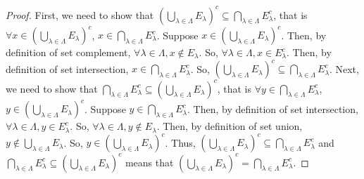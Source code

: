 \documentclass[12pt,letterpaper]{article}
\begin{document}
\begin{itemize}[leftmargin=!,labelindent=5pt]
\begin{itemize}
                    \begin{spacing}{1.175}
                        \begin{proof}
                            First, we need to show that $(\bigcup_{\lambda \in \Lambda} E_\lambda)^c \subseteq \bigcap_{\lambda \in \Lambda} E_{\lambda}^c$, that is $\forall x \in (\bigcup_{\lambda \in \Lambda} E_\lambda)^c$, $x \in \bigcap_{\lambda \in \Lambda} E_{\lambda}^c$.
                            Suppose $x \in (\bigcup_{\lambda \in \Lambda} E_\lambda)^c$.
                            Then, by definition of set complement, $\forall \lambda \in \Lambda, x \notin E_\lambda$.
                            So, $\forall \lambda \in \Lambda, x \in E_\lambda^c$.
                            Then, by definition of set intersection, $x \in \bigcap_{\lambda \in \Lambda} E_{\lambda}^c$.
                            So, $(\bigcup_{\lambda \in \Lambda} E_\lambda)^c \subseteq \bigcap_{\lambda \in \Lambda} E_{\lambda}^c$.
                            Next, we need to show that $\bigcap_{\lambda \in \Lambda} E_{\lambda}^c \subseteq (\bigcup_{\lambda \in \Lambda} E_\lambda)^c$, that is $\forall y \in \bigcap_{\lambda \in \Lambda} E_{\lambda}^c$, $y \in (\bigcup_{\lambda \in \Lambda} E_\lambda)^c$.
                            Suppose $y \in \bigcap_{\lambda \in \Lambda} E_{\lambda}^c$.
                            Then, by definition of set intersection, $\forall \lambda \in \Lambda, y \in E_\lambda^c$.
                            So, $\forall \lambda \in \Lambda, y \notin E_\lambda$.
                            Then, by definition of set union, $y \notin \bigcup_{\lambda \in \Lambda} E_\lambda$.
                            So, $y \in (\bigcup_{\lambda \in \Lambda} E_\lambda)^c$.
                            Thus, $(\bigcup_{\lambda \in \Lambda} E_\lambda)^c \subseteq \bigcap_{\lambda \in \Lambda} E_{\lambda}^c$ and $\bigcap_{\lambda \in \Lambda} E_{\lambda}^c \subseteq (\bigcup_{\lambda \in \Lambda} E_\lambda)^c$ means that $(\bigcup_{\lambda \in \Lambda} E_\lambda)^c = \bigcap_{\lambda \in \Lambda} E_{\lambda}^c$.
                        \end{proof}


\end{spacing}
\end{itemize}
\end{itemize}
\end{document}
